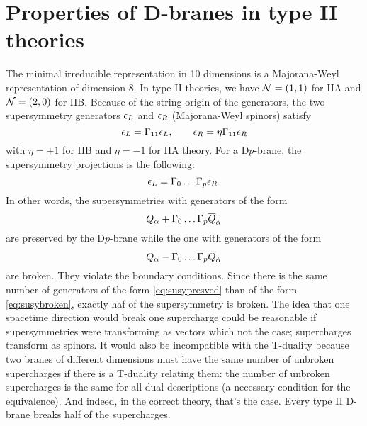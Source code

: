 \documentclass[a4paper,10pt]{article}
\begin{document}
\section{Properties of D-branes in type II theories}

    The minimal irreducible representation in 10 dimensions is a Majorana-Weyl representation of dimension 8. In type II theories, we have $\mathcal{N}=(1,1)$ for IIA and $\mathcal{N}=(2,0)$ for IIB. Because of the string origin of the generators, the two supersymmetry generators $\epsilon_L$ and $\epsilon_R$ (Majorana-Weyl spinors) satisfy
    \begin{equation}
        \epsilon_L=\Gamma_{11}\epsilon_L,\qquad \epsilon_R=\eta\Gamma_{11}\epsilon_R
    \end{equation}
    with $\eta=+1$ for IIB and $\eta=-1$ for IIA theory. For a D$p$-brane, the supersymmetry projections is the following:
    \begin{equation}
        \epsilon_L=\Gamma_0\dots\Gamma_p\epsilon_R.
    \end{equation}
    In other words, the supersymmetries with generators of the form
    \begin{equation}
        Q_\alpha+\Gamma_0\dots\Gamma_p\overline{Q}_{\dot{\alpha}}\label{eq:susypresved}
    \end{equation}
    are preserved by the D$p$-brane while the one with generators of the form
    \begin{equation}
        Q_\alpha-\Gamma_0\dots\Gamma_p\overline{Q}_{\dot{\alpha}}\label{eq:susybroken}
    \end{equation}
    are broken. They violate the boundary conditions. Since there is the same number of generators of the form \eqref{eq:susypresved} than of the form \eqref{eq:susybroken}, exactly haf of the supersymmetry is broken. The idea that one spacetime direction would break one supercharge could be reasonable if supersymmetries were transforming as vectors which not the case; supercharges transform as spinors. It would also be incompatible with the T-duality because two branes of different dimensions must have the same number of unbroken supercharges if there is a T-duality relating them: the number of unbroken supercharges is the same for all dual descriptions (a necessary condition for the equivalence). And indeed, in the correct theory, that's the case. Every type II D-brane breaks half of the supercharges.
\end{document}
